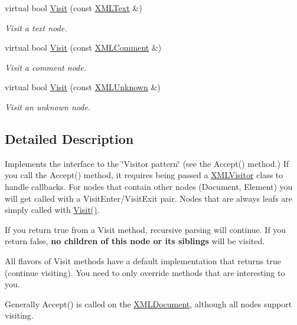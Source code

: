 \begin{DoxyCompactItemize}
virtual bool \mbox{\hyperlink{classtinyxml2_1_1_x_m_l_visitor_af30233565856480ea48b6fa0d6dec65b}{Visit}} (const \mbox{\hyperlink{classtinyxml2_1_1_x_m_l_text}{X\+M\+L\+Text}} \&)
\begin{DoxyCompactList}\small\item\em Visit a text node. \end{DoxyCompactList}\item 
virtual bool \mbox{\hyperlink{classtinyxml2_1_1_x_m_l_visitor_acc8147fb5a85f6c65721654e427752d7}{Visit}} (const \mbox{\hyperlink{classtinyxml2_1_1_x_m_l_comment}{X\+M\+L\+Comment}} \&)
\begin{DoxyCompactList}\small\item\em Visit a comment node. \end{DoxyCompactList}\item 
virtual bool \mbox{\hyperlink{classtinyxml2_1_1_x_m_l_visitor_a14e4748387c34bf53d24e8119bb1f292}{Visit}} (const \mbox{\hyperlink{classtinyxml2_1_1_x_m_l_unknown}{X\+M\+L\+Unknown}} \&)
\begin{DoxyCompactList}\small\item\em Visit an unknown node. \end{DoxyCompactList}\end{DoxyCompactItemize}


\subsection{Detailed Description}
Implements the interface to the \char`\"{}\+Visitor pattern\char`\"{} (see the Accept() method.) If you call the Accept() method, it requires being passed a \mbox{\hyperlink{classtinyxml2_1_1_x_m_l_visitor}{X\+M\+L\+Visitor}} class to handle callbacks. For nodes that contain other nodes (Document, Element) you will get called with a Visit\+Enter/\+Visit\+Exit pair. Nodes that are always leafs are simply called with \mbox{\hyperlink{classtinyxml2_1_1_x_m_l_visitor_adc75bd459fc7ba8223b50f0616767f9a}{Visit()}}.

If you return \textquotesingle{}true\textquotesingle{} from a Visit method, recursive parsing will continue. If you return false, {\bfseries no children of this node or its siblings} will be visited.

All flavors of Visit methods have a default implementation that returns \textquotesingle{}true\textquotesingle{} (continue visiting). You need to only override methods that are interesting to you.

Generally Accept() is called on the \mbox{\hyperlink{classtinyxml2_1_1_x_m_l_document}{X\+M\+L\+Document}}, although all nodes support visiting.

